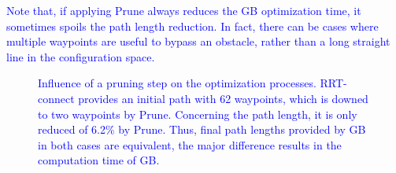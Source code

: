 \documentclass{tADR2e}
\begin{document}
\textcolor{blue}{Note that, if applying Prune always reduces the GB optimization time, it sometimes spoils the path length reduction. In fact, there can be cases where multiple waypoints are useful to bypass an obstacle, rather than a long straight line in the configuration space.
}

\begin{figure}[H]
	\centering
  \caption{\textcolor{blue}{Influence of a pruning step on the optimization processes. RRT-connect provides an initial path with 62 waypoints, which is downed to two waypoints by Prune. Concerning the path length, it is only reduced of 6.2\% by Prune. Thus, final path lengths provided by GB in both cases are equivalent, the major difference results in the computation time of GB.}}
  \label{fig:pruningInfluence}
\end{figure}
\end{document}
